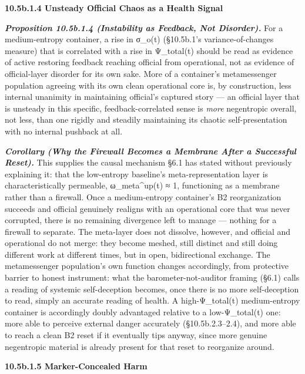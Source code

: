 \documentclass[
]{article}
\begin{document}
\textbf{10.5b.1.4 Unsteady Official Chaos as a Health Signal}

\emph{\textbf{Proposition 10.5b.1.4 (Instability as Feedback, Not
Disorder).}} For a medium-entropy container, a rise in σ\_o(t)
(§10.5b.1's variance-of-changes measure) that is correlated with a rise
in Ψ\_total(t) should be read as evidence of active restoring feedback
reaching official from operational, not as evidence of official-layer
disorder for its own sake. More of a container's metamessenger
population agreeing with its own clean operational core is, by
construction, less internal unanimity in maintaining official's captured
story --- an official layer that is unsteady in this specific,
feedback-correlated sense is \emph{more} negentropic overall, not less,
than one rigidly and steadily maintaining its chaotic self-presentation
with no internal pushback at all.

\emph{\textbf{Corollary (Why the Firewall Becomes a Membrane After a
Successful Reset).}} This supplies the causal mechanism §6.1 has stated
without previously explaining it: that the low-entropy baseline's
meta-representation layer is characteristically permeable,
ω\_meta\^{}up(t) ≈ 1, functioning as a membrane rather than a firewall.
Once a medium-entropy container's B2 reorganization succeeds and
official genuinely realigns with an operational core that was never
corrupted, there is no remaining divergence left to manage --- nothing
for a firewall to separate. The meta-layer does not dissolve, however,
and official and operational do not merge: they become meshed, still
distinct and still doing different work at different times, but in open,
bidirectional exchange. The metamessenger population's own function
changes accordingly, from protective barrier to honest instrument: what
the barometer-not-auditor framing (§6.1) calls a reading of systemic
self-deception becomes, once there is no more self-deception to read,
simply an accurate reading of health. A high-Ψ\_total(t) medium-entropy
container is accordingly doubly advantaged relative to a low-Ψ\_total(t)
one: more able to perceive external danger accurately (§10.5b.2.3--2.4),
and more able to reach a clean B2 reset if it eventually tips anyway,
since more genuine negentropic material is already present for that
reset to reorganize around.

\textbf{10.5b.1.5 Marker-Concealed Harm}
\end{document}
